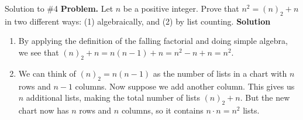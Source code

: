 \documentclass[10pt]{beamer}
\begin{document}
\begin{frame}{Solution to \#4}
\textbf{Problem.} Let $n$ be a positive integer. Prove that $n^2 = (n)_2 + n$ in two different ways: (1) algebraically, and (2) by list counting.
\vfill 
\textbf{Solution}
\begin{enumerate}
	\item By applying the definition of the falling factorial and doing simple algebra, we see that $(n)_2 +n = n(n-1) +n = n^2 - n + n = n^2$.
	\item We can think of $(n)_2 = n(n-1)$ as the number of lists in a chart with $n$ rows and $n-1$ columns.  Now suppose we add another column.  This gives us $n$ additional lists, making the total number of lists $(n)_2 + n$. But the new chart now has $n$ rows and $n$ columns, so it contains $n \cdot n =n^2$ lists.
\end{enumerate}
\end{frame}
\end{document}

